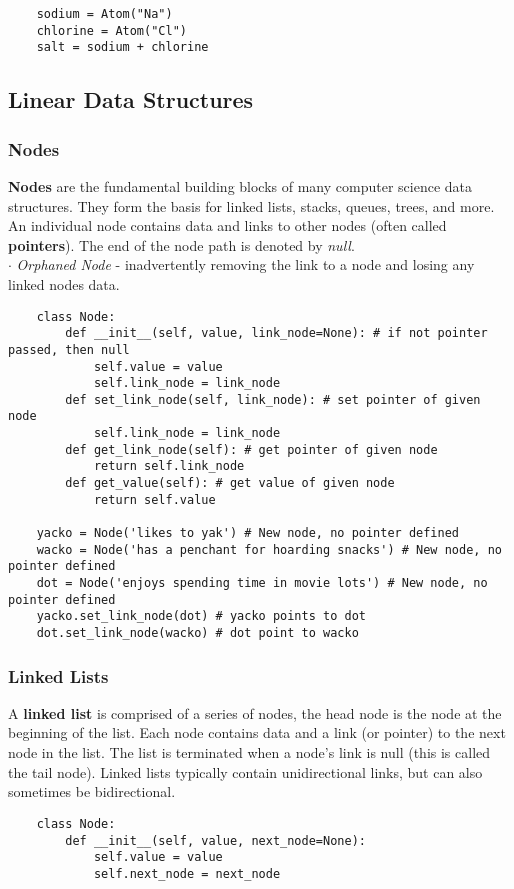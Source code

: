 \documentclass[11pt, a4paper]{article}
\begin{document}
\begin{spacing}{1.1}
\begin{lstlisting}
	sodium = Atom("Na")
	chlorine = Atom("Cl")
	salt = sodium + chlorine \end{lstlisting}\vspace*{4mm}
	
	\subsection{Linear Data Structures}
	\subsubsection{Nodes}
	\textbf{Nodes} are the fundamental building blocks of many computer science data structures. They form the basis for linked lists, stacks, queues, trees, and more. An individual node contains data and links to other nodes (often called \textbf{pointers}). The end of the node path is denoted by \textit{null}. \\
	\hspace*{1.5mm} $\cdot$ \textit{Orphaned Node} - inadvertently removing the link to a node and losing any linked nodes data.
	\begin{lstlisting}
	class Node:
		def __init__(self, value, link_node=None): # if not pointer passed, then null
			self.value = value
			self.link_node = link_node	
		def set_link_node(self, link_node): # set pointer of given node
			self.link_node = link_node	
		def get_link_node(self): # get pointer of given node
			return self.link_node	
		def get_value(self): # get value of given node
			return self.value 
	
	yacko = Node('likes to yak') # New node, no pointer defined
	wacko = Node('has a penchant for hoarding snacks') # New node, no pointer defined
	dot = Node('enjoys spending time in movie lots') # New node, no pointer defined
	yacko.set_link_node(dot) # yacko points to dot
	dot.set_link_node(wacko) # dot point to wacko \end{lstlisting} \newpage

	\subsubsection{Linked Lists} 
	A \textbf{linked list} is comprised of a series of nodes, the head node is the node at the beginning of the list. Each node contains data and a link (or pointer) to the next node in the list. The list is terminated when a node’s link is null (this is called the tail node). Linked lists typically contain unidirectional links, but can also sometimes be bidirectional. 
	\begin{lstlisting}
	class Node:
		def __init__(self, value, next_node=None):
			self.value = value
			self.next_node = next_node
			

\end{lstlisting}
\end{spacing}
\end{document}
